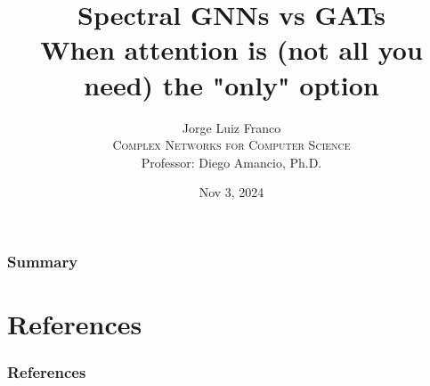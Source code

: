 \documentclass[aspectratio=169,dvipsnames]{beamer}
\title[Spectral GNNs vs GAT
]{Spectral GNNs vs GATs \\ When attention is (not all you need) the "only" option
}
\author[Jorge Luiz Franco]{Jorge Luiz Franco\\ \bigskip
\textsc{Complex Networks for Computer Science}\\ \bigskip
Professor: Diego Amancio, Ph.D.}
\institute[ICMC/USP]{Universidade de São Paulo - ICMC}
\date[2024]{\footnotesize{Nov 3, 2024}}
\begin{document}
    
    \begin{frame}[plain]
        \titlepage
    \end{frame}
    
    \begin{frame}
      \frametitle{Summary}
      \tableofcontents
    \end{frame}
    








% 


% 




\section{References}

\begin{frame}[allowframebreaks]
  \frametitle{References}
  
  
  
\end{frame}
\end{document}
